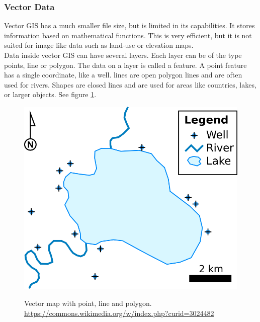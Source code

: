 \subsubsection{Vector Data}
Vector GIS has a much smaller file size, but is limited in its capabilities. It stores information based on mathematical functions. This is very efficient, but it is not suited for image like data such as land-use or elevation maps.\\
Data inside vector GIS can have several layers. Each layer can be of the type points, line or polygon. The data on a layer is called a feature. A point feature has a single coordinate, like a well. lines are open polygon lines and are often used for rivers. Shapes are closed lines and are used for areas like countries, lakes, or larger objects. See figure \ref{img:vector}. \\
\begin{figure}[H]
	\centering
	\includegraphics[width=0.4\columnwidth]{res/vector-map}\\
	\caption[]{Vector map with point, line and polygon. \url{https://commons.wikimedia.org/w/index.php?curid=3024482}}
	\label{img:vector}
\end{figure}



%
%
%
